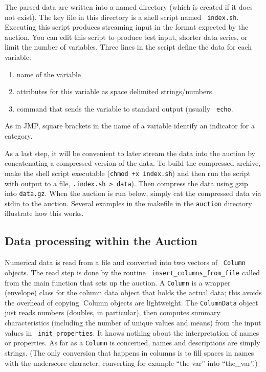 \documentclass[12pt]{article}
\begin{document}
 The parsed data are written into a named directory (which is created if it does
 not exist).  The key file in this directory is a shell script named {\tt
 index.sh}.  Executing this script produces streaming input in the format
 expected by the auction.  You can edit this script to produce test input,
 shorter data series, or limit the number of variables.  Three lines in the
 script define the data for each variable:
\begin{enumerate}
    \item  name of the variable
    \item  attributes for this variable as space delimited strings/numbers
    \item  command that sends the variable to standard output (usually {\tt
           echo}.
\end{enumerate}  
 As in JMP, square brackets in the name of a variable identify an indicator for
 a category. 

 As a last step, it will be convenient to later stream the data into the auction
 by concatenating a compressed version of the data.  To build the compressed
 archive, make the shell script executable ({\tt chmod +x index.sh}) and then
 run the script with output to a file, {\tt .\/index.sh > data}).  Then compress
 the data using gzip into {\tt data.gz}.  When the auction is run below, simply
 cat the compressed data via stdin to the auction.  Several examples in the
 makefile in the {\tt auction} directory illustrate how this works.


\subsection{Data processing within the Auction} 
 

 Numerical data is read from a file aud converted into two vectors of {\tt
 Column} objects.  The read step is done by the routine {\tt
 insert\_columns\_from\_file} called from the main function that sets up the
 auction.  A {\tt Column} is a wrapper (envelope) class for the column data
 object that holds the actual data; this avoids the overhead of copying.  Column
 objects are lightweight.  The {\tt ColumnData} object just reads numbers
 (doubles, in particular), then computes summary characteristics (including the
 number of unique values and means) from the input values in {\tt
 init\_properties}.  It knows nothing about the interpretation of names or
 properties.  As far as a {\tt Column} is concerned, names and descriptions are
 simply strings.  (The only conversion that happens in columns is to fill spaces
 in names with the underscore character, converting for example ``the var'' into
 ``the\_var''.)
\end{document}
